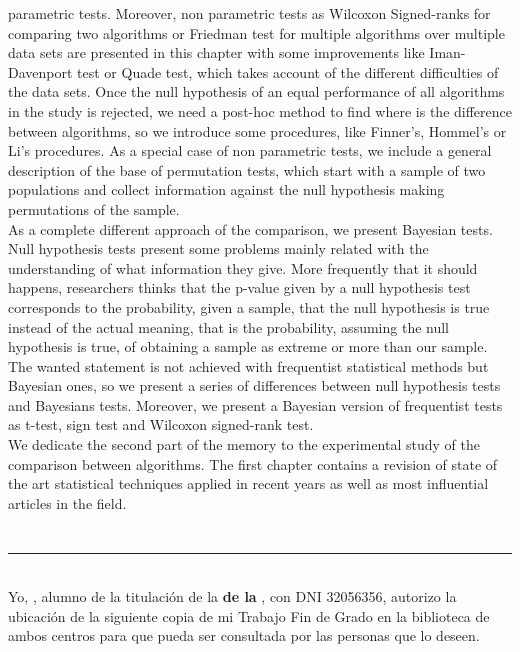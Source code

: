 parametric tests. Moreover, non parametric tests as Wilcoxon 
Signed-ranks for comparing two algorithms or Friedman test 
for multiple algorithms over multiple data sets are presented 
in this chapter with some improvements like Iman-Davenport 
test or Quade test, which takes account of the different 
difficulties of the data sets. Once the null hypothesis of an 
equal performance of all algorithms in the study is rejected, 
we need a post-hoc method to find where is the difference 
between algorithms, so we introduce some procedures, like 
Finner’s, Hommel’s or Li’s procedures. As a special case of 
non parametric tests, we include a general description of the 
base of permutation tests, which start with a sample of two 
populations and collect information against the null 
hypothesis making permutations of the sample.\\ 
	As a complete different approach of the comparison, we 
present Bayesian tests. Null hypothesis tests present some 
problems mainly related with the understanding of what 
information they give. More frequently that it should 
happens, researchers thinks that the p-value given by a null 
hypothesis test corresponds to the probability, given a 
sample, that the null hypothesis is true instead of the 
actual meaning, that is the probability, assuming the null 
hypothesis is true, of obtaining a sample as extreme or more 
than our sample. The wanted statement is not achieved with 
frequentist statistical methods but Bayesian ones, so we 
present a series of differences between null hypothesis tests 
and Bayesians tests. Moreover, we present a Bayesian version 
of frequentist tests as t-test, sign test and Wilcoxon 
signed-rank test.\\
	We dedicate the second part of the memory to the 
experimental study of the comparison between algorithms. The 
first chapter contains a revision of state of the art 
statistical techniques applied in recent years as well as 
most influential articles in the field. 



\chapter*{}
\thispagestyle{empty}

\noindent\rule[-1ex]{\textwidth}{2pt}\\[4.5ex]

Yo, \textbf{\myName}, alumno de la titulación \myDegree de la \textbf{\myFaculty de la \myUni}, con DNI 32056356, autorizo la
ubicación de la siguiente copia de mi Trabajo Fin de Grado en la biblioteca de ambos centros para que pueda ser
consultada por las personas que lo deseen.

